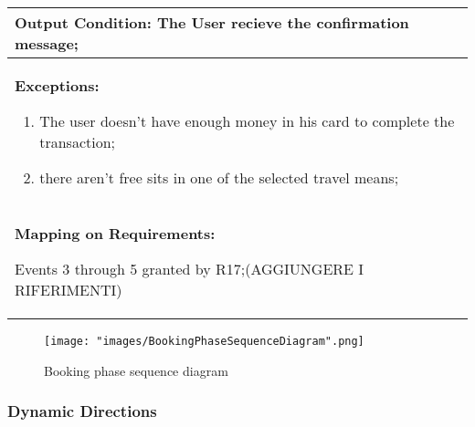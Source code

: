 \begin{longtable}{|p{14cm}|}
\textbf{Output Condition:} The User recieve the confirmation message; \\ \hline

\textbf{Exceptions:}

\begin{enumerate}
\item The user doesn't have enough money in his card to complete the transaction;
\item there aren't free sits in one of the selected travel means; 
\end{enumerate} \\ \hline

\textbf{Mapping on Requirements:}

Events 3 through 5 granted by R17;(AGGIUNGERE I RIFERIMENTI) \\ \hline

\end{longtable}

\begin{figure}[H]
\begin{center}
\texttt{[image: "images/BookingPhaseSequenceDiagram".png]}
\caption{Booking phase sequence diagram}
\label{img:seqDiagrAppEditing00}
\end{center}
\end{figure}

\subsubsection{Dynamic Directions} \label{usecase:Dynamic Directions}

